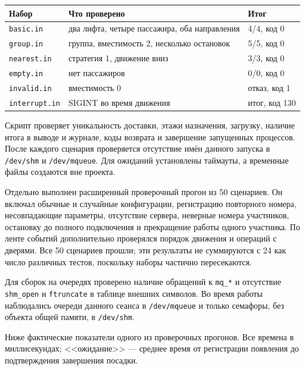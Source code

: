 \documentclass[12pt,a4paper]{article}
\begin{document}
\begin{center}
\begin{tabular}{@{}p{32mm}p{90mm}p{30mm}@{}}
\textbf{Набор} & \textbf{Что проверено} & \textbf{Итог} \\
\hline
\verb|basic.in| & два лифта, четыре пассажира, оба направления & 4/4, код 0 \\
\verb|group.in| & группа, вместимость 2, несколько остановок & 5/5, код 0 \\
\verb|nearest.in| & стратегия 1, движение вниз & 3/3, код 0 \\
\verb|empty.in| & нет пассажиров & 0/0, код 0 \\
\verb|invalid.in| & вместимость 0 & отказ, код 1 \\
\verb|interrupt.in| & SIGINT во время движения & итог, код 130 \\
\hline
\end{tabular}
\end{center}

Скрипт проверяет уникальность доставки, этажи назначения, загрузку,
наличие итога в выводе и журнале, коды возврата и завершение запущенных
процессов. После каждого сценария проверяется отсутствие имён данного
запуска в \verb|/dev/shm| и \verb|/dev/mqueue|. Для ожиданий установлены
таймауты, а временные файлы создаются вне проекта.

Отдельно выполнен расширенный проверочный прогон из 50 сценариев.
Он включал обычные и случайные конфигурации, регистрацию повторного
номера, несовпадающие параметры, отсутствие сервера, неверные номера
участников, остановку до полного подключения и прекращение работы
одного участника. По ленте событий дополнительно проверялся порядок
движения и операций с дверями. Все 50 сценариев прошли; эти результаты
не суммируются с 24 как число различных тестов, поскольку наборы
частично пересекаются.

Для сборок на очередях проверено наличие обращений к \verb|mq_*|
и отсутствие \verb|shm_open| и \verb|ftruncate| в таблице внешних
символов. Во время работы наблюдались очереди данного сеанса в
\verb|/dev/mqueue| и только семафоры, без объекта общей памяти,
в \verb|/dev/shm|.

Ниже фактические показатели одного из проверочных прогонов. Все времена
в миллисекундах; <<ожидание>> --- среднее время от регистрации появления
до подтверждения завершения посадки.
\end{document}
